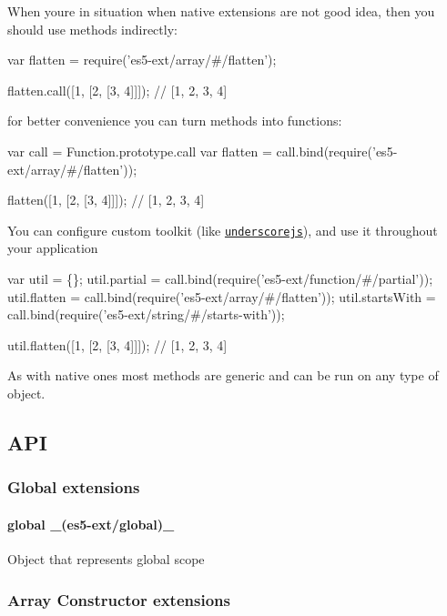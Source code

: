 When you\textquotesingle{}re in situation when native extensions are not good idea, then you should use methods indirectly\+:


\begin{DoxyCode}
var flatten = require('es5-ext/array/#/flatten');

flatten.call([1, [2, [3, 4]]]); // [1, 2, 3, 4]
\end{DoxyCode}


for better convenience you can turn methods into functions\+:


\begin{DoxyCode}
var call = Function.prototype.call
var flatten = call.bind(require('es5-ext/array/#/flatten'));

flatten([1, [2, [3, 4]]]); // [1, 2, 3, 4]
\end{DoxyCode}


You can configure custom toolkit (like \href{http://underscorejs.org/}{\tt underscorejs}), and use it throughout your application


\begin{DoxyCode}
var util = \{\};
util.partial = call.bind(require('es5-ext/function/#/partial'));
util.flatten = call.bind(require('es5-ext/array/#/flatten'));
util.startsWith = call.bind(require('es5-ext/string/#/starts-with'));

util.flatten([1, [2, [3, 4]]]); // [1, 2, 3, 4]
\end{DoxyCode}


As with native ones most methods are generic and can be run on any type of object.

\subsection*{A\+PI}

\subsubsection*{Global extensions}

\paragraph*{global \+\_\+(es5-\/ext/global)\+\_\+}

Object that represents global scope

\subsubsection*{Array Constructor extensions}

